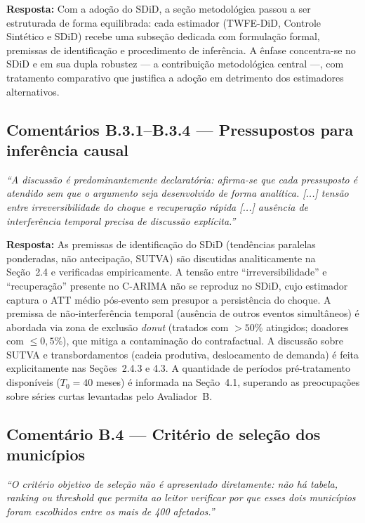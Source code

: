 \documentclass[a4paper,12pt]{article}
\newcommand{\avB}[1]{\textcolor{corB}{\textit{#1}}}
\newcommand{\resposta}[1]{\noindent\textbf{Resposta:} #1}
\begin{document}
\bigskip

\resposta{Com a adoção do SDiD, a seção metodológica passou a ser estruturada de forma
equilibrada: cada estimador (TWFE-DiD, Controle Sintético e SDiD) recebe uma
subseção dedicada com formulação formal, premissas de identificação e procedimento de
inferência. A ênfase concentra-se no SDiD e em sua dupla robustez — a contribuição
metodológica central —, com tratamento comparativo que justifica a adoção em detrimento
dos estimadores alternativos.}

\bigskip

\subsection*{Comentários B.3.1--B.3.4 — Pressupostos para inferência causal}

\avB{``A discussão é predominantemente declaratória: afirma-se que cada pressuposto é
atendido sem que o argumento seja desenvolvido de forma analítica. [...] tensão entre
irreversibilidade do choque e recuperação rápida [...] ausência de interferência temporal
precisa de discussão explícita.''}

\bigskip

\resposta{As premissas de identificação do SDiD (tendências paralelas ponderadas,
não antecipação, SUTVA) são discutidas analiticamente na Seção~2.4 e verificadas
empiricamente. A tensão entre ``irreversibilidade'' e ``recuperação'' presente no
C-ARIMA não se reproduz no SDiD, cujo estimador captura o ATT médio pós-evento sem
presupor a persistência do choque. A premissa de não-interferência temporal (ausência
de outros eventos simultâneos) é abordada via zona de exclusão \textit{donut}
(tratados com $>50\%$ atingidos; doadores com $\leq 0{,}5\%$), que mitiga a
contaminação do contrafactual. A discussão sobre SUTVA e transbordamentos (cadeia
produtiva, deslocamento de demanda) é feita explicitamente nas Seções~2.4.3 e 4.3. A
quantidade de períodos pré-tratamento disponíveis ($T_0 = 40$ meses) é informada na
Seção~4.1, superando as preocupações sobre séries curtas levantadas pelo Avaliador~B.}

\bigskip

\subsection*{Comentário B.4 — Critério de seleção dos municípios}

\avB{``O critério objetivo de seleção não é apresentado diretamente: não há tabela,
ranking ou threshold que permita ao leitor verificar por que esses dois municípios foram
escolhidos entre os mais de 400 afetados.''}
\end{document}
